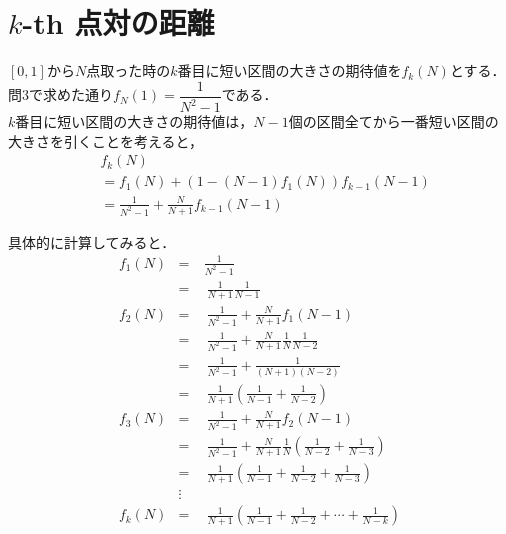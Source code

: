 \section{$k$-th 点対の距離}
$[0,1]$から$N$点取った時の$k$番目に短い区間の大きさの期待値を$f_k(N)$とする．
問3で求めた通り$f_N(1) = \dfrac{1}{N^2-1}$である．\\
$k$番目に短い区間の大きさの期待値は，$N-1$個の区間全てから一番短い区間の大きさを引くことを考えると，
\begin{align*}
  &f_k(N)\\
  &= f_1(N) + (1 - (N-1)f_1(N))f_{k-1}(N-1)\\
  &= \frac{1}{N^2-1} + \frac{N}{N+1}f_{k-1}(N-1)
\end{align*}

具体的に計算してみると．
\begin{align*}
  & f_1(N) &=\ & \frac{1}{N^2-1} &\\
  & &=&\  \frac{1}{N+1}\frac{1}{N-1} &\\
  & f_2(N) &=&\  \frac{1}{N^2-1} + \frac{N}{N+1}f_1(N-1) &\\
  &  &=&\  \frac{1}{N^2-1} + \frac{N}{N+1}\frac{1}{N}\frac{1}{N-2}&\\
  &  &=&\  \frac{1}{N^2-1} + \frac{1}{(N+1)(N-2)}&\\
  &  &=&\  \frac{1}{N+1}\left(\frac{1}{N-1} + \frac{1}{N-2}\right)&\\
  & f_3(N) &=&\  \frac{1}{N^2-1} + \frac{N}{N+1}f_2(N-1)&\\
  &  &=&\  \frac{1}{N^2-1} + \frac{N}{N+1}\frac{1}{N}\left(\frac{1}{N-2} + \frac{1}{N-3}\right)&\\
  &  &=&\  \frac{1}{N+1}\left(\frac{1}{N-1} + \frac{1}{N-2} + \frac{1}{N-3} \right)&\\
  & &\vdots&&\\
  & f_k(N) &=&\  \frac{1}{N+1} \left( \frac{1}{N-1} + \frac{1}{N-2} + \cdots + \frac{1}{N-k} \right)&
\end{align*}

